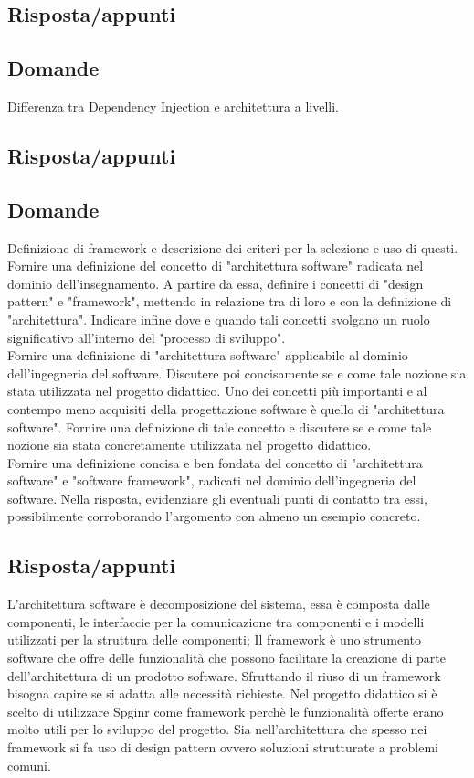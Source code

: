\subsection*{Risposta/appunti}

\subsection*{Domande}
Differenza tra Dependency Injection e architettura a livelli.

\subsection*{Risposta/appunti}

\subsection*{Domande}
Definizione di framework e descrizione dei criteri per la selezione e uso di questi.\\

Fornire una definizione del concetto di "architettura software" radicata nel dominio dell'insegnamento. 
A partire da essa, definire i concetti di "design pattern" e "framework", mettendo in relazione tra di loro e con la definizione di "architettura". 
Indicare infine dove e quando tali concetti svolgano un ruolo significativo all'interno del "processo di sviluppo".\\

Fornire una definizione di "architettura software" applicabile al dominio dell'ingegneria del software. 
Discutere poi concisamente se e come tale nozione sia stata utilizzata nel progetto didattico.
Uno dei concetti più importanti e al contempo meno acquisiti della progettazione software è quello di "architettura software". 
Fornire una definizione di tale concetto e discutere se e come tale nozione sia stata concretamente utilizzata nel progetto didattico.\\

Fornire una definizione concisa e ben fondata del concetto di "architettura software" e "software framework", radicati nel dominio dell'ingegneria del software.
Nella risposta, evidenziare gli eventuali punti di contatto tra essi, possibilmente corroborando l'argomento con almeno un esempio concreto.

\subsection*{Risposta/appunti}
L'architettura software è decomposizione del sistema, essa è composta dalle componenti, le interfaccie per la
comunicazione tra componenti e i modelli utilizzati per la struttura delle componenti;
Il framework è uno strumento software che offre delle funzionalità che possono facilitare la creazione di parte
dell'architettura di un prodotto software.
Sfruttando il riuso di un framework bisogna capire se si adatta alle necessità richieste. Nel progetto didattico si è scelto
di utilizzare Spginr come framework perchè le funzionalità offerte erano molto utili per lo sviluppo del progetto.
Sia nell'architettura che spesso nei framework si fa uso di design pattern ovvero soluzioni strutturate a problemi comuni.

